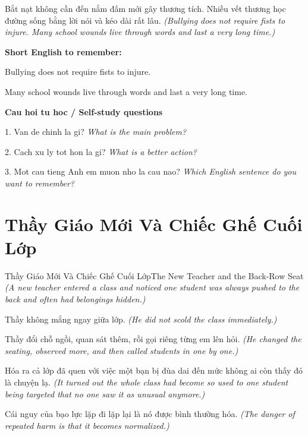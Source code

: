 \begin{baihoc}
Bắt nạt không cần đến nắm đấm mới gây thương tích. Nhiều vết thương học đường sống bằng lời nói và kéo dài rất lâu.
\textit{(Bullying does not require fists to injure. Many school wounds live through words and last a very long time.)}
\end{baihoc}

\begin{ghinhoanh}
\textbf{Short English to remember:}

Bullying does not require fists to injure.

Many school wounds live through words and last a very long time.

\end{ghinhoanh}

\begin{tuhocnhanh}
\textbf{Cau hoi tu hoc / Self-study questions}

1. Van de chinh la gi? \textit{What is the main problem?}

2. Cach xu ly tot hon la gi? \textit{What is a better action?}

3. Mot cau tieng Anh em muon nho la cau nao? \textit{Which English sentence do you want to remember?}
\end{tuhocnhanh}
\ngancach

\section{Thầy Giáo Mới Và Chiếc Ghế Cuối Lớp}
\begin{truyen}{Thầy Giáo Mới Và Chiếc Ghế Cuối Lớp}{The New Teacher and the Back-Row Seat}
\textit{(A new teacher entered a class and noticed one student was always pushed to the back and often had belongings hidden.)}

Thầy không mắng ngay giữa lớp.
\textit{(He did not scold the class immediately.)}

Thầy đổi chỗ ngồi, quan sát thêm, rồi gọi riêng từng em lên hỏi.
\textit{(He changed the seating, observed more, and then called students in one by one.)}

Hóa ra cả lớp đã quen với việc một bạn bị đùa dai đến mức không ai còn thấy đó là chuyện lạ.
\textit{(It turned out the whole class had become so used to one student being targeted that no one saw it as unusual anymore.)}

Cái nguy của bạo lực lặp đi lặp lại là nó được bình thường hóa.
\textit{(The danger of repeated harm is that it becomes normalized.)}

\end{truyen}

